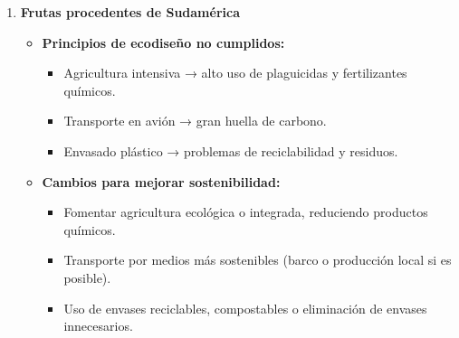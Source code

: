 \begin{solution}
\begin{enumerate}[label=\alph*)]
    \item \textbf{Frutas procedentes de Sudamérica}
    \begin{itemize}
        \item \textbf{Principios de ecodiseño no cumplidos:}
            \begin{itemize}
                \item Agricultura intensiva → alto uso de plaguicidas y fertilizantes químicos.
                \item Transporte en avión → gran huella de carbono.
                \item Envasado plástico → problemas de reciclabilidad y residuos.
            \end{itemize}
        \item \textbf{Cambios para mejorar sostenibilidad:}
            \begin{itemize}
                \item Fomentar agricultura ecológica o integrada, reduciendo productos químicos.
                \item Transporte por medios más sostenibles (barco o producción local si es posible).
                \item Uso de envases reciclables, compostables o eliminación de envases innecesarios.
            \end{itemize}
    \end{itemize}
\end{enumerate}
\end{solution}
